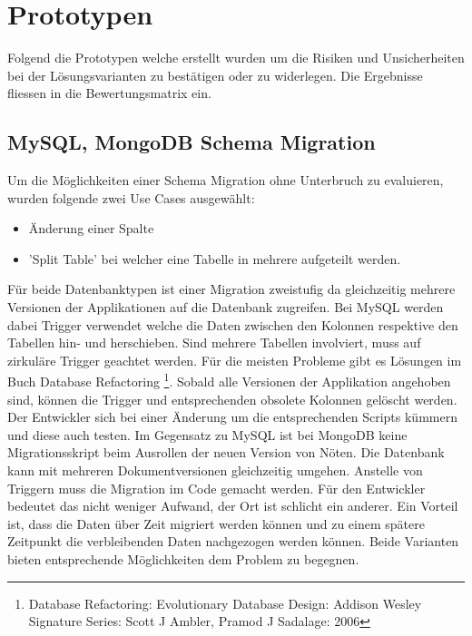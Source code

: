 \section{Prototypen}

Folgend die Prototypen welche erstellt wurden um die Risiken und Unsicherheiten bei der Lösungsvarianten zu bestätigen oder zu widerlegen. Die Ergebnisse fliessen in die Bewertungsmatrix ein.

\subsection{MySQL, MongoDB Schema Migration}

Um die Möglichkeiten einer Schema Migration ohne Unterbruch zu evaluieren, wurden folgende zwei Use Cases ausgewählt:
\newline
\begin{itemize}
	\item Änderung einer Spalte
	\item 'Split Table' bei welcher eine Tabelle in mehrere aufgeteilt werden.
\end{itemize}

Für beide Datenbanktypen ist einer Migration zweistufig da gleichzeitig mehrere Versionen der Applikationen auf die Datenbank zugreifen. Bei MySQL werden dabei Trigger verwendet welche die Daten zwischen den Kolonnen respektive den Tabellen hin- und herschieben. Sind mehrere Tabellen involviert, muss auf zirkuläre Trigger geachtet werden. Für die meisten Probleme gibt es Lösungen im Buch Database Refactoring \footnote{Database Refactoring: Evolutionary Database Design: Addison Wesley Signature Series: Scott J Ambler, Pramod J Sadalage: 2006}. Sobald alle Versionen der Applikation angehoben sind, können die Trigger und entsprechenden obsolete Kolonnen gelöscht werden. Der Entwickler sich bei einer Änderung um die entsprechenden Scripts kümmern und diese auch testen.\newline
Im Gegensatz zu MySQL ist bei MongoDB keine Migrationsskript beim Ausrollen der neuen Version von Nöten. Die Datenbank kann mit mehreren Dokumentversionen gleichzeitig umgehen. Anstelle von Triggern muss die Migration im Code gemacht werden. Für den Entwickler bedeutet das nicht weniger Aufwand, der Ort ist schlicht ein anderer. Ein Vorteil ist, dass die Daten über Zeit migriert werden können und zu einem spätere Zeitpunkt die verbleibenden Daten nachgezogen werden können.\newline
Beide Varianten bieten entsprechende Möglichkeiten dem Problem zu begegnen.

